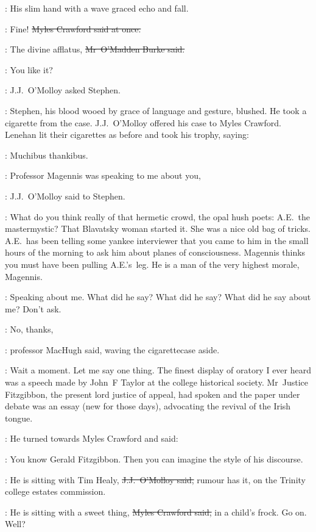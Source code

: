 :
His slim hand with a wave graced echo and fall.

\crawford:
Fine!
\sout{Myles Crawford said at once.}

\omaddenburke:
The divine afflatus,
\sout{Mr~O'Madden Burke said.}

\jjom:
You like it?

:
J.J.~O'Molloy asked Stephen.

:
Stephen,
his blood wooed by grace of language and gesture,
blushed.
He took a cigarette from the case.
J.J.~O'Molloy offered his case to Myles Crawford.
Lenehan lit their cigarettes as before
and took his trophy,
saying:

\lenehan:
Muchibus thankibus.



\jjom:
Professor Magennis was speaking to me about you,

:
J.J.~O'Molloy said to Stephen.

\jjom:
What do you think really of that hermetic crowd,
the opal hush poets:
A.E.~the mastermystic?
That Blavatsky woman started it.
She was a nice old bag of tricks.
A.E.~has been telling some yankee interviewer
that you came to him in the small hours of the morning
to ask him about planes of consciousness.
Magennis thinks you must have been pulling A.E.'s~leg.
He is a man of the very highest morale,
Magennis.

\StephenInt:
Speaking about me.
What did he say?
What did he say?
What did he say about me?
Don't ask.

\machugh:
No, thanks,

:
professor MacHugh said,
waving the cigarettecase aside.

\machugh:
Wait a moment.
Let me say one thing.
The finest display of oratory I ever heard
was a speech made by John~F Taylor at the college historical society.
Mr~Justice Fitzgibbon,
the present lord justice of appeal,
had spoken
and the paper under debate was an essay (new for those days),
advocating the revival of the Irish tongue.

:
He turned towards Myles Crawford and said:

\machugh:
You know Gerald Fitzgibbon.
Then you can imagine the style of his discourse.

\jjom:
He is sitting with Tim Healy,
\sout{J.J.~O'Molloy said,}
rumour has it,
on the Trinity college estates commission.

\crawford:
He is sitting with a sweet thing,
\sout{Myles Crawford said,}
in a child's frock.
Go on.
Well?

